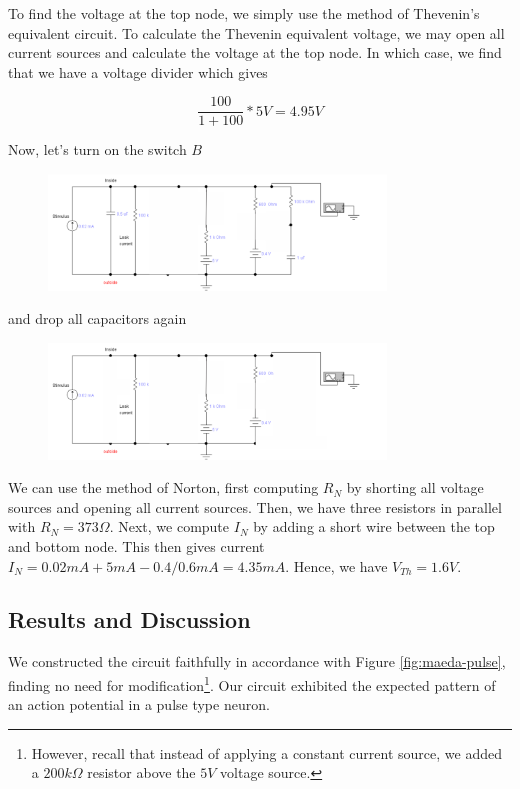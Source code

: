 \documentclass[12]{book}
\newcommand\0{\mathbf{0}}
\newcommand\<{\langle}
\renewcommand\>{\rangle}
\begin{document}
To find the voltage at the top node, we simply use the method of Thevenin's equivalent circuit\cite{fortney1987principles}. To calculate the Thevenin equivalent voltage, we may open all current sources and calculate the voltage at the top node. In which case, we find that we have a voltage divider which gives 

$$\frac{100}{1+100} * 5V = 4.95 V$$

Now, let's turn on the switch $B$
 
 \begin{figure}[H]
\includegraphics[width=0.8\textwidth]{exercise1-5}
\end{figure}

and drop all capacitors again
 
\begin{figure}[H]
\centering
\includegraphics[width=0.8\textwidth]{exercise1-6}
\end{figure}

We can use the method of Norton, first computing $R_{N}$ by shorting all voltage sources and opening all current sources. Then, we have three resistors in parallel with $R_{N} = 373 \Omega$. Next, we compute $I_N$ by adding a short wire between the top and bottom node. This then gives current $I_N = 0.02 mA + 5 mA - 0.4/0.6 mA = 4.35 mA$. Hence, we have $V_{Th} = 1.6 V$.

\subsection{Results and Discussion}

We constructed the circuit faithfully in accordance with Figure \ref{fig:maeda-pulse}, finding no need for modification\footnote{However, recall that instead of applying a constant current source, we added a $200k\Omega$ resistor above the $5V$ voltage source.}. Our circuit exhibited the expected pattern of an action potential in  a pulse type neuron.
\end{document}

